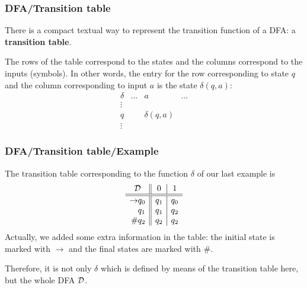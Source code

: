 % 
\begin{frame}
\frametitle{DFA/Transition table}

There is a compact textual way to represent the transition function of
a DFA: a \textbf{transition table}.

\bigskip

The rows of the table correspond to the states and the columns
correspond to the inputs (symbols). In other words, the entry for
the row corresponding to state \(q\) and the column corresponding to
input \(a\) is the state \(\delta (q, a)\):
\[
\begin{array}{c||c|c|c}
\delta & \ldots & a & \ldots\\
\hline\hline
\vdots & & &\\
\hline
q & & \delta (q, a)\\
\hline
\vdots & & &
\end{array}
\]

\end{frame}

% 
\begin{frame}
\frametitle{DFA/Transition table/Example}

The transition table corresponding to the function \(\delta\) of our
last example is
\[
\begin{array}{r@{}l||c|c}
\multicolumn{2}{c||}{\cal D} & 0 & 1\\
\hline\hline
\rightarrow & q_0 & q_1 & q_0\\
            & q_1 & q_1 & q_2\\
         \# & q_2 & q_2 & q_2
\end{array}
\]
Actually, we added some extra information in the table: the initial
state is marked with \(\rightarrow\) and the final states are marked
with \(\#\).

\bigskip

Therefore, it is not only \(\delta\) which is defined by means of the
transition table here, but the whole DFA \(\cal D\).

\end{frame}

